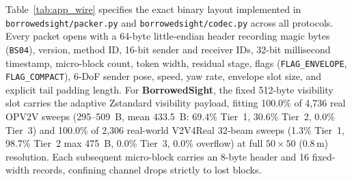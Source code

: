 \documentclass[journal]{IEEEtran}
\begin{document}
Table~\ref{tab:app_wire} specifies the exact binary layout implemented in \texttt{borrowedsight/packer.py} and \texttt{borrowedsight/codec.py} across all protocols. Every packet opens with a 64-byte little-endian header recording magic bytes (\texttt{BS04}), version, method ID, 16-bit sender and receiver IDs, 32-bit millisecond timestamp, micro-block count, token width, residual stage, flags (\texttt{FLAG\_ENVELOPE}, \texttt{FLAG\_COMPACT}), 6-DoF sender pose, speed, yaw rate, envelope slot size, and explicit tail padding length. For \textbf{BorrowedSight}, the fixed 512-byte visibility slot carries the adaptive Zstandard visibility payload, fitting 100.0\% of 4,736 real OPV2V sweeps (295--509~B, mean 433.5~B: 69.4\% Tier~1, 30.6\% Tier~2, 0.0\% Tier~3) and 100.0\% of 2,306 real-world V2V4Real 32-beam sweeps (1.3\% Tier~1, 98.7\% Tier~2 max 475~B, 0.0\% Tier~3, 0.0\% overflow) at full $50\times 50$ ($0.8\,\mathrm{m}$) resolution. Each subsequent micro-block carries an 8-byte header and 16 fixed-width records, confining channel drops strictly to lost blocks.

\begin{table}[!tbp]
\centering
\caption{Exact serialized wire-packet byte allocation across B1, B2 / Where2comm-Occ, B3-VQ / CodeFilling-Occ, and \textbf{BorrowedSight} at 16,384~B and 32,768~B budgets ($\epsilon_{\mathrm{byte}} = 0.0\%$).}
\label{tab:app_wire}
\end{table}
\end{document}
